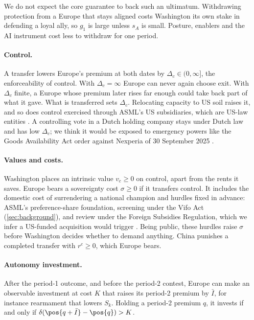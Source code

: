 We do not expect the core guarantee to back such an ultimatum. Withdrawing protection from a Europe that stays aligned costs Washington its own stake in defending a loyal ally, so $g_1$ is large unless $s_A$ is small. Posture, enablers and the AI instrument cost less to withdraw for one period.

\paragraph{Control.} A transfer lowers Europe's premium at both dates by $\Delta_c\in(0,\infty]$, the enforceability of control. With $\Delta_c=\infty$ Europe can never again choose exit. With $\Delta_c$ finite, a Europe whose premium later rises far enough could take back part of what it gave. What is transferred sets $\Delta_c$. Relocating capacity to US soil raises it, and so does control exercised through ASML's US subsidiaries, which are US-law entities \citep{asml2026subsidiaries}. A controlling vote in a Dutch holding company stays under Dutch law and has low $\Delta_c$; we think it would be exposed to emergency powers like the Goods Availability Act order against Nexperia of 30 September 2025 \citep{kst32637720}.

\paragraph{Values and costs.} Washington places an intrinsic value $v_c\ge 0$ on control, apart from the rents it saves. Europe bears a sovereignty cost $\sigma\ge 0$ if it transfers control. It includes the domestic cost of surrendering a national champion and hurdles fixed in advance: ASML's preference-share foundation, screening under the Vifo Act (\cref{sec:background}), and review under the Foreign Subsidies Regulation, which we infer a US-funded acquisition would trigger \citep{eu2022fsr}. Being public, these hurdles raise $\sigma$ before Washington decides whether to demand anything. China punishes a completed transfer with $r^c\ge 0$, which Europe bears.

\paragraph{Autonomy investment.} After the period-1 outcome, and before the period-2 contest, Europe can make an observable investment at cost $K$ that raises its period-2 premium by $\bar I$, for instance rearmament that lowers $S_k$. Holding a period-2 premium $q$, it invests if and only if $\delta(\pos{q+\bar I}-\pos{q})>K$.

